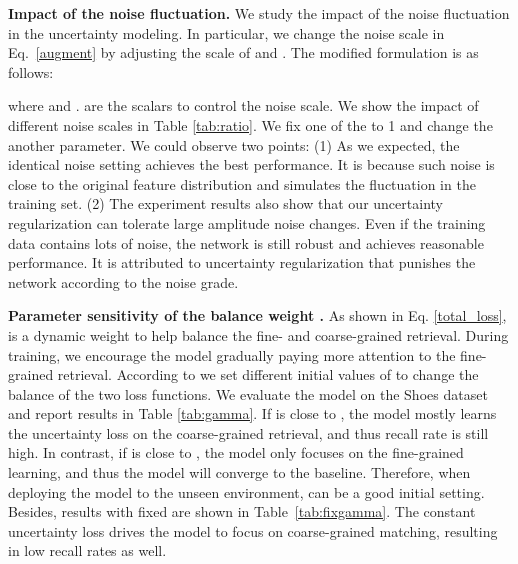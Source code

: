 \documentclass[10pt,twocolumn,letterpaper]{article}
\begin{document}
\begin{table}[t]
\scriptsize
    \vspace{-.15in}
    \caption{Ablation Study on fixed  on the Shoes dataset.}
    \label{tab:fixgamma}\vspace{-.15in}
\end{table}

\noindent\textbf{Impact of the noise fluctuation.}
We study the impact of the noise fluctuation in the uncertainty modeling. In particular, we change the noise scale in Eq.~\ref{augment} by adjusting the scale of  and . The modified formulation is as follows:\vspace{-2mm}

where  and .  are the scalars to control the noise scale. 
We show the impact of different noise scales in Table \ref{tab:ratio}. We fix one of the  to 1 and change the another parameter.
We could observe two points: (1) As we expected, the identical noise setting  achieves the best performance. It is because such noise is close to the original feature distribution and simulates the fluctuation in the training set. 
(2) The experiment results also show that our uncertainty regularization can tolerate large amplitude noise changes. Even if the training data contains lots of noise, the network is still robust and achieves reasonable performance. It is attributed to uncertainty regularization that punishes the network according to the noise grade.

\noindent\textbf{Parameter sensitivity of the balance weight .} 
As shown in Eq. \ref{total_loss},  is a dynamic weight to help balance the fine- and coarse-grained retrieval. During training, we encourage the model gradually paying more attention to the fine-grained retrieval. According to  we set different initial values of  to change the balance of the two loss functions. 
We evaluate the model on the Shoes dataset and report results in Table \ref{tab:gamma}. 
If  is close to , the model mostly learns the uncertainty loss on the coarse-grained retrieval, and thus recall rate is still high. In contrast, if  is close to , the model only focuses on the fine-grained learning, and thus the model will converge to the baseline. Therefore, when deploying the model to the unseen environment,  can be a good initial setting. Besides, results with fixed  are shown in Table~\ref{tab:fixgamma}. The constant uncertainty loss drives the model to focus on coarse-grained matching, resulting in low recall rates as well.
\end{document}
